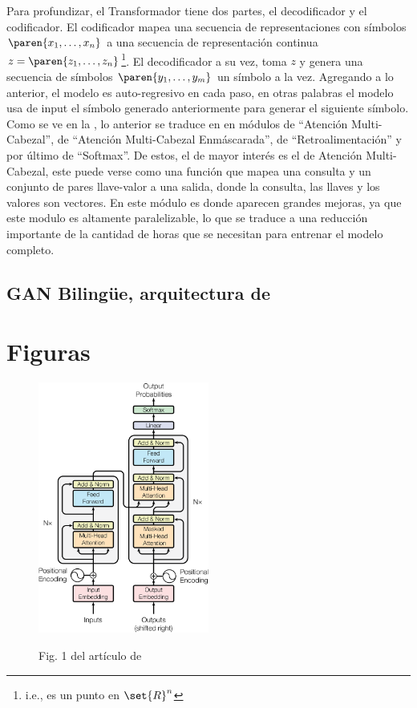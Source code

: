\documentclass{homework}
\begin{document}
Para profundizar, el Transformador tiene dos partes, el decodificador y el codificador. El codificador mapea una secuencia de representaciones con símbolos \(\paren{x_1,\dots,x_n}\) a una secuencia de representación continua \(z=\paren{z_1,\dots,z_n}\)\footnote{i.e., es un punto en \(\set{R}^n\)}. El decodificador a su vez, toma \(z\) y genera una secuencia de símbolos \(\paren{y_1,\dots,y_m}\) un símbolo a la vez. Agregando a lo anterior, el modelo es auto-regresivo en cada paso, en otras palabras el modelo usa de input el símbolo generado anteriormente para generar el siguiente símbolo. Como se ve en la , lo anterior se traduce en en módulos de ``Atención Multi-Cabezal'', de ``Atención Multi-Cabezal Enmáscarada'', de ``Retroalimentación'' y por último de ``Softmax''. De estos, el de mayor interés es el de Atención Multi-Cabezal, este puede verse como una función que mapea una consulta y un conjunto de pares llave-valor a una salida, donde la consulta, las llaves y los valores son vectores. En este módulo es donde aparecen grandes mejoras, ya que este modulo es altamente paralelizable, lo que se traduce a una reducción importante de la cantidad de horas que se necesitan para entrenar el modelo completo.

\subsection*{GAN Bilingüe, arquitectura de }

\section*{Figuras}
\begin{figure}[H]
    \caption{Fig. 1 del artículo de \protect\cite{vaswani2017attention}}
    \centering
    \includegraphics[width=0.5\textwidth]{Fig1.png}
    \label{fig1:attention}
\end{figure}



\end{document}
